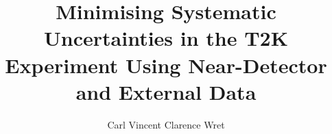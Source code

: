 \documentclass[hyperpdf,bindnopdf,alphafoot]{hepthesis}
\title{Minimising Systematic Uncertainties in the T2K Experiment Using Near-Detector and External Data}
\author{Carl Vincent Clarence Wret}
\begin{document}
\begin{frontmatter}
  
\end{frontmatter}

% 
% 
% 
% 
\begin{mainmatter}
  
  
  
  
  
  
  
  
  
  
  
  
\end{mainmatter}

\begin{appendices}
	
	
	
	
	
	
	
\end{appendices}

\begin{backmatter}
  
\end{backmatter}

\end{document}
